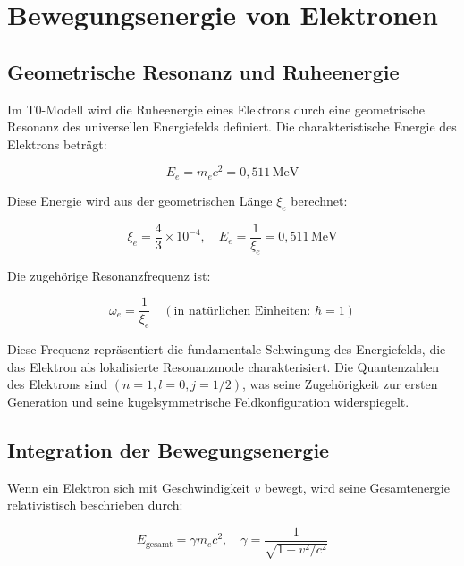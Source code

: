 	\section{Bewegungsenergie von Elektronen}
	\label{sec:electron_kinetic_energy}
	
	\subsection{Geometrische Resonanz und Ruheenergie}
	\label{subsec:electron_rest_energy}
	
	Im T0-Modell wird die Ruheenergie eines Elektrons durch eine geometrische Resonanz des universellen Energiefelds definiert. Die charakteristische Energie des Elektrons beträgt:
	
	\begin{equation}
		E_e = m_e c^2 = 0,511 \, \text{MeV}
	\end{equation}
	
	Diese Energie wird aus der geometrischen Länge \(\xi_e\) berechnet:
	
	\begin{equation}
		\xi_e = \frac{4}{3} \times 10^{-4}, \quad E_e = \frac{1}{\xi_e} = 0,511 \, \text{MeV}
		\label{eq:electron_energy}
	\end{equation}
	
	Die zugehörige Resonanzfrequenz ist:
	
	\begin{equation}
		\omega_e = \frac{1}{\xi_e} \quad (\text{in natürlichen Einheiten: } \hbar = 1)
	\end{equation}
	
	Diese Frequenz repräsentiert die fundamentale Schwingung des Energiefelds, die das Elektron als lokalisierte Resonanzmode charakterisiert. Die Quantenzahlen des Elektrons sind \((n=1, l=0, j=1/2)\), was seine Zugehörigkeit zur ersten Generation und seine kugelsymmetrische Feldkonfiguration widerspiegelt.
	
	\subsection{Integration der Bewegungsenergie}
	\label{subsec:electron_kinetic}
	
	Wenn ein Elektron sich mit Geschwindigkeit \( v \) bewegt, wird seine Gesamtenergie relativistisch beschrieben durch:
	
	\begin{equation}
		E_{\text{gesamt}} = \gamma m_e c^2, \quad \gamma = \frac{1}{\sqrt{1 - v^2/c^2}}
	\end{equation}
	
